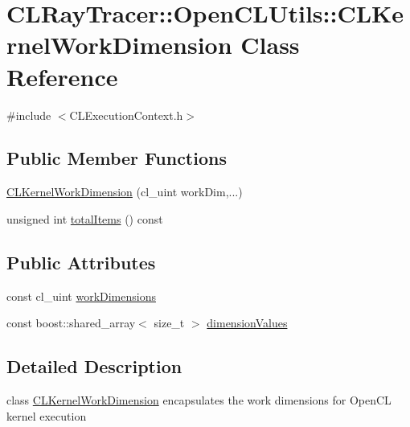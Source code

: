 \hypertarget{class_c_l_ray_tracer_1_1_open_c_l_utils_1_1_c_l_kernel_work_dimension}{}\section{C\+L\+Ray\+Tracer\+:\+:Open\+C\+L\+Utils\+:\+:C\+L\+Kernel\+Work\+Dimension Class Reference}
\label{class_c_l_ray_tracer_1_1_open_c_l_utils_1_1_c_l_kernel_work_dimension}


{\ttfamily \#include $<$C\+L\+Execution\+Context.\+h$>$}

\subsection*{Public Member Functions}
\begin{DoxyCompactItemize}
\item 
\hyperlink{class_c_l_ray_tracer_1_1_open_c_l_utils_1_1_c_l_kernel_work_dimension_a16bab2ce5ac4dcc1f62072222af09a21}{C\+L\+Kernel\+Work\+Dimension} (cl\+\_\+uint work\+Dim,...)
\item 
unsigned int \hyperlink{class_c_l_ray_tracer_1_1_open_c_l_utils_1_1_c_l_kernel_work_dimension_a855d1646e6140f8a832b3bcffbcf0fb4}{total\+Items} () const 
\end{DoxyCompactItemize}
\subsection*{Public Attributes}
\begin{DoxyCompactItemize}
\item 
const cl\+\_\+uint \hyperlink{class_c_l_ray_tracer_1_1_open_c_l_utils_1_1_c_l_kernel_work_dimension_affd23924899b196276bedd7010af3e30}{work\+Dimensions}
\item 
const boost\+::shared\+\_\+array$<$ size\+\_\+t $>$ \hyperlink{class_c_l_ray_tracer_1_1_open_c_l_utils_1_1_c_l_kernel_work_dimension_aabe343f3cd0fb5a0320c73bb50a77ff0}{dimension\+Values}
\end{DoxyCompactItemize}


\subsection{Detailed Description}
class \hyperlink{class_c_l_ray_tracer_1_1_open_c_l_utils_1_1_c_l_kernel_work_dimension}{C\+L\+Kernel\+Work\+Dimension} encapsulates the work dimensions for Open\+CL kernel execution 

